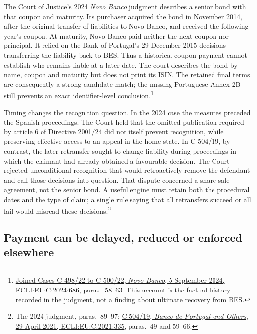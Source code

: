 The Court of Justice's 2024 \emph{Novo Banco} judgment describes a senior
bond with that coupon and maturity. Its purchaser acquired the bond in
November 2014, after the original transfer of liabilities to Novo Banco,
and received the following year's coupon. At maturity, Novo Banco paid
neither the next coupon nor principal. It relied on the Bank of Portugal's
29 December 2015 decisions transferring the liability back to BES.
Thus a historical coupon payment cannot establish who remains liable at a
later date. The court describes the bond by name, coupon and maturity but
does not print its ISIN. The retained final terms are consequently a strong
candidate match; the missing Portuguese Annex 2B still prevents an exact
identifier-level conclusion.\footnote{
\href{../prospectus/corner-cases-2026-10-04/sources/jur-more-c498-judgment/source.html}
{Joined Cases C-498/22 to C-500/22, \emph{Novo Banco}, 5 September 2024,
ECLI:EU:C:2024:686}, paras.~58--63. This account is the factual history
recorded in the judgment, not a finding about ultimate recovery from BES.}

Timing changes the recognition question. In the 2024 case the measures
preceded the Spanish proceedings. The Court held that the omitted publication
required by article 6 of Directive 2001/24 did not itself prevent recognition,
while preserving effective access to an appeal in the home state.
In C-504/19, by contrast, the later retransfer sought to change liability
during proceedings in which the claimant had already obtained a favourable
decision. The Court rejected unconditional recognition that would
retroactively remove the defendant and call those decisions into question.
That dispute concerned a share-sale agreement, not the senior bond.
A useful engine must retain both the procedural dates and the type of claim;
a single rule saying that all retransfers succeed or all fail would misread
these decisions.\footnote{The 2024 judgment, paras.~89--97;
\href{../prospectus/corner-cases-2026-10-04/sources/jur-more-novo2021-judgment/source.html}
{C-504/19, \emph{Banco de Portugal and Others}, 29 April 2021,
ECLI:EU:C:2021:335}, paras.~49 and 59--66.}

\subsection{Payment can be delayed, reduced or enforced elsewhere}

